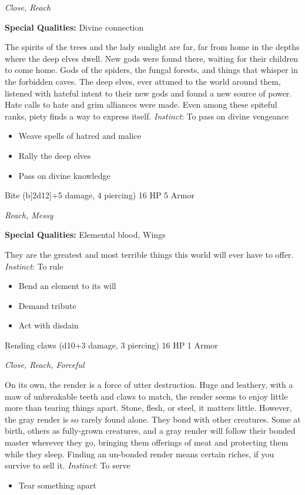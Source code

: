 \emph{Close, Reach}

\textbf{Special Qualities:}
Divine connection

\HRule
The spirits of the trees and the lady sunlight are far, far from home in the depths where the deep elves dwell. New gods were found there, waiting for their children to come home. Gods of the spiders, the fungal forests, and things that whisper in the forbidden caves. The deep elves, ever attuned to the world around them, listened with hateful intent to their new gods and found a new source of power. Hate calls to hate and grim alliances were made. Even among these spiteful ranks, piety finds a way to express itself. \emph{Instinct}: To pass on divine vengeance
\begin{itemize}
\item Weave spells of hatred and malice
\item Rally the deep elves
\item Pass on divine knowledge
\end{itemize}

\HRule
{}

Bite (b[2d12]+5 damage, 4 piercing)\hspace*{\fill} 16 HP 5 Armor

\emph{Reach, Messy}

\textbf{Special Qualities:}
Elemental blood, Wings

\HRule
They are the greatest and most terrible things this world will ever have to offer. \emph{Instinct}: To rule
\begin{itemize}
\item Bend an element to its will
\item Demand tribute
\item Act with disdain
\end{itemize}

\HRule
{}

Rending claws (d10+3 damage, 3 piercing)\hspace*{\fill} 16 HP 1 Armor

\emph{Close, Reach, Forceful}

\HRule
On its own, the render is a force of utter destruction. Huge and leathery, with a maw of unbreakable teeth and claws to match, the render seems to enjoy little more than tearing things apart. Stone, flesh, or steel, it matters little. However, the gray render is so rarely found alone. They bond with other creatures. Some at birth, others as fully-grown creatures, and a gray render will follow their bonded master wherever they go, bringing them offerings of meat and protecting them while they sleep. Finding an un-bonded render means certain riches, if you survive to sell it. \emph{Instinct}: To serve
\begin{itemize}
\item Tear something apart
\end{itemize}
\newpage
\HRule
{}

